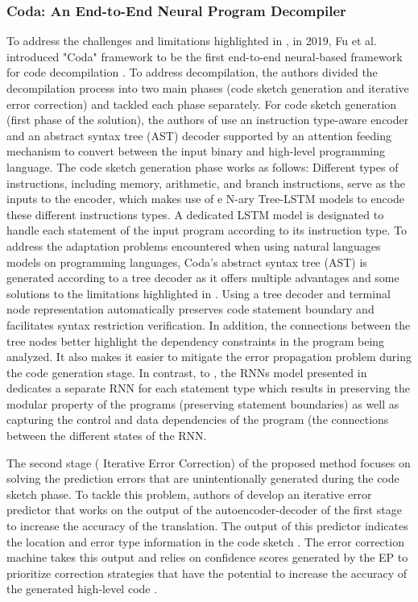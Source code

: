 \documentclass[conference,a4paper]{IEEEtran}
\begin{document}
\subsubsection{Coda: An End-to-End Neural Program Decompiler}
To address the challenges and limitations highlighted in \cite{fu_neural-based_2019}, in 2019, Fu et al. introduced "Coda" framework to be the first end-to-end neural-based framework for code decompilation \cite{fu_neural-based_2019}. To address decompilation, the authors divided the decompilation process into two main phases (code sketch generation and iterative error correction) and tackled each phase separately.
For code sketch generation (first phase of the solution), the authors of \cite{fu_neural-based_2019} use an instruction type-aware encoder and an abstract syntax tree (AST) decoder supported by an attention feeding mechanism to convert between the input binary and high-level programming language.  The code sketch generation phase works as follows: Different types of instructions, including memory, arithmetic, and branch instructions, serve as the inputs to the encoder, which makes use of e N-ary Tree-LSTM models to encode these different instructions types. A dedicated LSTM model is designated to handle each statement of the input program according to its instruction type. To address the adaptation problems encountered when using natural languages models on programming languages, Coda's abstract syntax tree (AST) is generated according to a tree decoder as it offers multiple advantages and some solutions to the limitations highlighted in \cite{katz_using_2018}. Using a tree decoder and terminal node representation automatically preserves code statement boundary and facilitates syntax restriction verification. In addition, the connections between the tree nodes better highlight the dependency constraints in the program being analyzed. It also makes it easier to mitigate the error propagation problem during the code generation stage. In contrast, to \cite{katz_using_2018}, the RNNs model presented in \cite{fu_neural-based_2019} dedicates a separate RNN for each statement type which results in preserving the modular property of the programs (preserving statement boundaries) as well as capturing the control and data dependencies of the program (the connections between the different states of the RNN.  

The second stage ( Iterative Error Correction) of the proposed method focuses on solving the prediction errors that are unintentionally generated during the code sketch phase. To tackle this problem, authors of \cite{fu_neural-based_2019} develop an iterative error predictor that works on the output of the autoencoder-decoder of the first stage to increase the accuracy of the translation. The output of this predictor indicates the location and error type information in the code sketch \cite{fu_neural-based_2019}. The error correction machine takes this output and relies on confidence scores generated by the EP to prioritize correction strategies that have the potential to increase the accuracy of the generated high-level code \cite{fu_neural-based_2019}.
\end{document}

